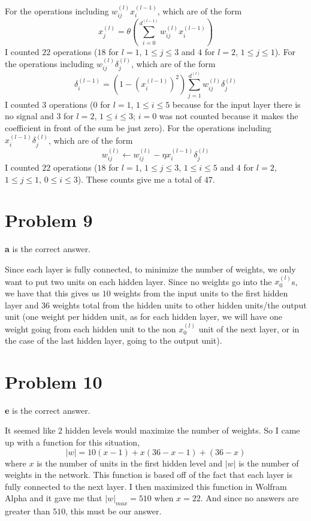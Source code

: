 \documentclass{article}
\begin{document}
\noindent For the operations including $w_{ij}^{(l)}x_i^{(l-1)}$, which
are of the form
\[ x_j^{(l)} = \theta(\sum_{i=0}^{d^{(l-1)}} w_{ij}^{(l)} x_i^{(l-1)}) \]
I counted $22$ operations ($18$ for $l = 1$, $1 \leq j \leq 3$ and $4$
for $l=2$, $1 \leq j \leq 1$). For the operations including
$w_{ij}^{(l)}\delta_{j}^{(l)}$, which are of the form
\[ \delta_i^{(l-1)} = (1-(x_i^{(l-1)})^2) \sum_{j=1}^{d^{(l)}} w_{ij}^{(l)}
    \delta_j^{(l)} \]
I counted $3$ operations ($0$ for $l=1$,
$1 \leq i \leq 5$ because for the input layer there is no signal
and $3$ for $l=2$, $1 \leq i \leq 3$; $i=0$ was not counted
because it makes the coefficient
in front of the sum be just zero). For the operations including $x_i^{(l-1)}
\delta_j^{(l)}$, which are of the form
\[ w_{ij}^{(l)} \leftarrow w_{ij}^{(l)} - \eta x_i^{(l-1)} \delta_j^{(l)} \]
I counted $22$ operations ($18$ for $l=1$, $1 \leq j \leq 3$, $1 \leq i \leq 5$
and $4$ for $l=2$, $1 \leq j \leq 1$, $0 \leq i \leq 3$). These counts
give me a total of $47$.

\section*{Problem 9}
\textbf{a} is the correct answer.

\noindent Since each layer is fully connected, to minimize the number of
weights, we only want to put two units
on each hidden layer. Since no weights go into the $x_0^{(l)}$s, we have that
this gives us $10$ weights from the input units to the first hidden layer and
$36$ weights total from the hidden units to other hidden units/the output unit
(one weight per hidden unit, as for each hidden layer, we will have one weight
going from each hidden unit to the non $x_0^{(l)}$ unit of the next layer, or
in the case of the last hidden layer, going to the output unit).

\section*{Problem 10}
\textbf{e} is the correct answer.

\noindent It seemed like 2 hidden levels would maximize the number of weights.
So I came up with a function for this situation,
\[ |w| = 10(x-1) + x(36-x-1) + (36-x) \]
where $x$ is the number of units in the first hidden level and $|w|$ is the
number of weights in the network. This function is based off of the fact that each
layer is fully connected to the next layer. I then maximized this function in
Wolfram Alpha and it gave me that $|w|_{max} = 510$ when $x=22$. And since no
answers are greater than $510$, this must be our answer.
\end{document}
